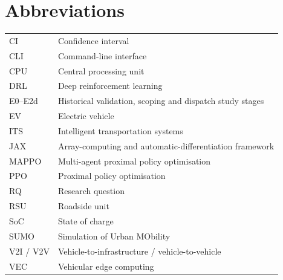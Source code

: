 \documentclass[12pt,a4paper]{article}
\begin{document}
\section*{Abbreviations}
\begin{tabularx}{\textwidth}{@{}lX@{}}
CI & Confidence interval\\
CLI & Command-line interface\\
CPU & Central processing unit\\
DRL & Deep reinforcement learning\\
E0--E2d & Historical validation, scoping and dispatch study stages\\
EV & Electric vehicle\\
ITS & Intelligent transportation systems\\
JAX & Array-computing and automatic-differentiation framework\\
MAPPO & Multi-agent proximal policy optimisation\\
PPO & Proximal policy optimisation\\
RQ & Research question\\
RSU & Roadside unit\\
SoC & State of charge\\
SUMO & Simulation of Urban MObility\\
V2I / V2V & Vehicle-to-infrastructure / vehicle-to-vehicle\\
VEC & Vehicular edge computing\\
\end{tabularx}
\clearpage
\end{document}
